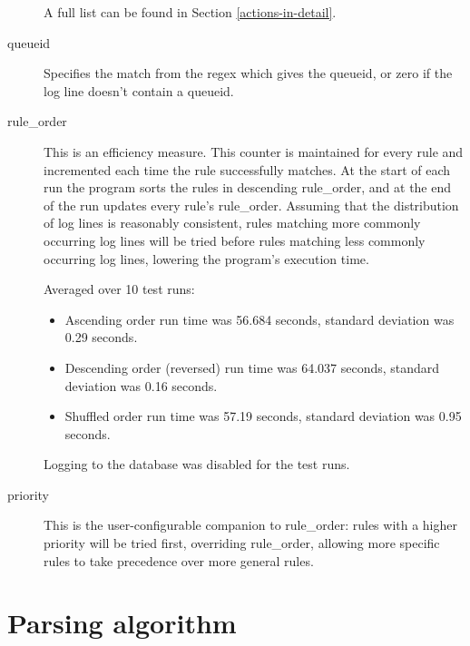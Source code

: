 \documentclass[a4paper,12pt,draft]{article}
\begin{document}
\begin{description}
\begin{description}
        \end{description}

        A full list can be found in Section \ref{actions-in-detail}.

    \item [queueid] Specifies the match from the regex which gives the
        queueid, or zero if the log line doesn't contain a queueid.

    \item [rule\_order] This is an efficiency measure.  This counter is
        maintained for every rule and incremented each time the rule
        successfully matches.  At the start of each run the program sorts
        the rules in descending rule\_order, and at the end of the run
        updates every rule's rule\_order.  Assuming that the 
        distribution of log lines is reasonably consistent, rules matching
        more commonly occurring log lines will be tried before rules
        matching less commonly occurring log lines, lowering the program's
        execution time.

        Averaged over 10 test runs:

        \begin{itemize} 

            \item Ascending order run time was 56.684 seconds, standard
                deviation was 0.29 seconds.

            \item Descending order (reversed) run time was 64.037 seconds,
                standard deviation was 0.16 seconds.

            \item Shuffled order run time was 57.19 seconds, standard
                deviation was 0.95 seconds.

        \end{itemize}

        Logging to the database was disabled for the test runs.

    \item [priority] This is the user-configurable companion to
        rule\_order: rules with a higher priority will be tried first,
        overriding rule\_order, allowing more specific rules to take
        precedence over more general rules.

\end{description}




\section{Parsing algorithm}
\end{document}
